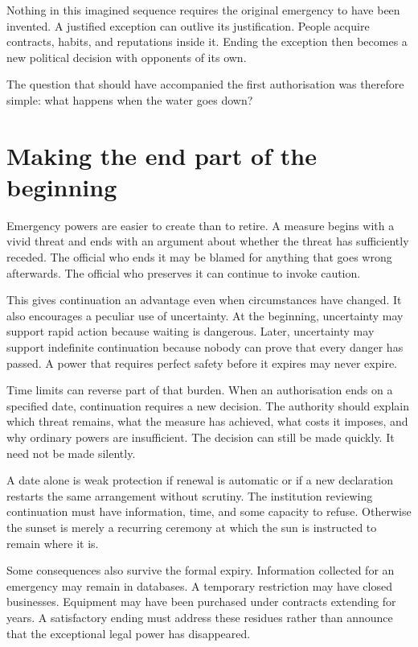\documentclass[12pt,a4paper]{book}
\begin{document}
Nothing in this imagined sequence requires the original emergency to have been invented. A justified exception can outlive its justification. People acquire contracts, habits, and reputations inside it. Ending the exception then becomes a new political decision with opponents of its own.

The question that should have accompanied the first authorisation was therefore simple: what happens when the water goes down?

\section*{Making the end part of the beginning}

Emergency powers are easier to create than to retire. A measure begins with a vivid threat and ends with an argument about whether the threat has sufficiently receded. The official who ends it may be blamed for anything that goes wrong afterwards. The official who preserves it can continue to invoke caution.

This gives continuation an advantage even when circumstances have changed. It also encourages a peculiar use of uncertainty. At the beginning, uncertainty may support rapid action because waiting is dangerous. Later, uncertainty may support indefinite continuation because nobody can prove that every danger has passed. A power that requires perfect safety before it expires may never expire.

Time limits can reverse part of that burden. When an authorisation ends on a specified date, continuation requires a new decision. The authority should explain which threat remains, what the measure has achieved, what costs it imposes, and why ordinary powers are insufficient. The decision can still be made quickly. It need not be made silently.

A date alone is weak protection if renewal is automatic or if a new declaration restarts the same arrangement without scrutiny. The institution reviewing continuation must have information, time, and some capacity to refuse. Otherwise the sunset is merely a recurring ceremony at which the sun is instructed to remain where it is.

Some consequences also survive the formal expiry. Information collected for an emergency may remain in databases. A temporary restriction may have closed businesses. Equipment may have been purchased under contracts extending for years. A satisfactory ending must address these residues rather than announce that the exceptional legal power has disappeared.
\end{document}
